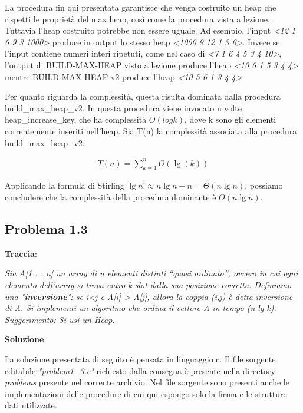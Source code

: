 \documentclass{article}
\begin{document}
\noindent
La procedura fin qui presentata garantisce che venga costruito un heap che rispetti le proprietà del max heap, così come la procedura vista a lezione. Tuttavia l'heap costruito potrebbe non essere uguale. Ad esempio, l'input \textit{<12 1 6 9 3 1000>} produce in output lo stesso heap \textit{<1000 9 12 1 3 6>}. Invece se l'input contiene numeri interi ripetuti, come nel caso di \textit{<7 1 6 4 5 3 4 10>}, l'output di BUILD-MAX-HEAP visto a lezione produce l'heap \textit{<10 6 1 5 3 4 4>} mentre BUILD-MAX-HEAP-v2 produce l'heap \textit{<10 5 6 1 3 4 4>}.

\noindent
Per quanto riguarda la complessità, questa risulta dominata dalla procedura build\_max\_heap\_v2. In questa procedura viene invocato n volte heap\_increase\_key, che ha complessità $O(log k)$, dove k sono gli elementi correntemente inseriti nell'heap. Sia T(n) la complessità associata alla procedura build\_max\_heap\_v2. 


\begin{equation} \label{eq:problem1_2}
\begin{aligned}
T(n) = \sum_{k=1}^{n} O(\lg(k))
\end{aligned}
\end{equation}

\noindent
Applicando la formula di Stirling $\lg{n!} \approx n \lg{n} - n = \Theta(n\lg{n})$, possiamo concludere che la complessità della procedura dominante è $\Theta(n\lg{n})$.



\subsection{Problema 1.3} \label{subsec:problema_1_3}
\textbf{Traccia}:

\noindent
\textit{Sia A[1 . . n] un array di n elementi distinti “quasi ordinato”, ovvero in cui ogni elemento dell'array si trova entro k slot dalla sua posizione corretta. Definiamo una "\textbf{inversione}": se i<j e A[i] > A[j], allora la coppia (i,j) è detta inversione di A. Si implementi un algoritmo che ordina il vettore A in tempo (n lg k). Suggerimento: Si usi un Heap.}

\vspace{2\baselineskip}
\noindent
\textbf{Soluzione}: 

\noindent
La soluzione presentata di seguito è pensata in linguaggio c. Il file sorgente editabile \textit{"problem1\_3.c"} richiesto dalla consegna è presente nella directory \textit{problems} presente nel corrente archivio. Nel file sorgente sono presenti anche le implementazioni delle procedure di cui qui espongo solo la firma e le strutture dati utilizzate.
\end{document}

